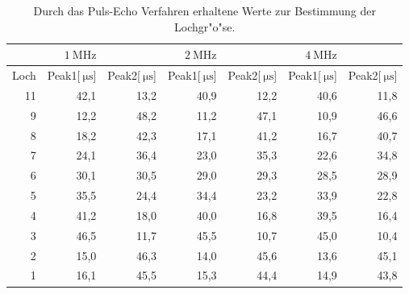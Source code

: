 
\begin{table}[!h]
\begin{center}
\begin{tabular}{|r|r|r|r|r|r|r|}
\hline
& $\SI{1}{\mega\hertz}$ && $\SI{2}{\mega\hertz}$ && $\SI{4}{\mega\hertz}$&\\
\hline
Loch & Peak1[$\SI{}{\micro\second}$] & Peak2[$\SI{}{\micro\second}$] & Peak1[$\SI{}{\micro\second}$] & Peak2[$\SI{}{\micro\second}$] & Peak1[$\SI{}{\micro\second}$] & Peak2[$\SI{}{\micro\second}$]\\
\hline
\hline
11 &	42,1 &	13,2 &	40,9 &	12,2 &	40,6 &	11,8\\
 9 & 	12,2 &	48,2 &	11,2 &	47,1 &	10,9 &	46,6\\
 8 &	18,2 &	42,3 &	17,1 &	41,2 &	16,7 &	40,7\\
 7 &	24,1 &	36,4 &	23,0 &	35,3 &	22,6 &	34,8\\
 6 &	30,1 &	30,5 &	29,0 &	29,3 &	28,5 &	28,9\\
 5 &	35,5 &	24,4 &	34,4 &	23,2 &	33,9 &	22,8\\
 4 &	41,2 &	18,0 &	40,0 &	16,8 &	39,5 &	16,4\\
 3 &	46,5 &	11,7 &	45,5 &	10,7 &	45,0 &	10,4\\
 2 &	15,0 &	46,3 &	14,0 &	45,6 &	13,6 &	45,1\\
 1 &	16,1 &	45,5 &	15,3 &	44,4 &	14,9 &	43,8\\
\hline
\end{tabular}
\caption[]{Durch das Puls-Echo Verfahren erhaltene Werte zur Bestimmung der Lochgr"o"se.}
\label{loch}
\end{center}
\end{table}